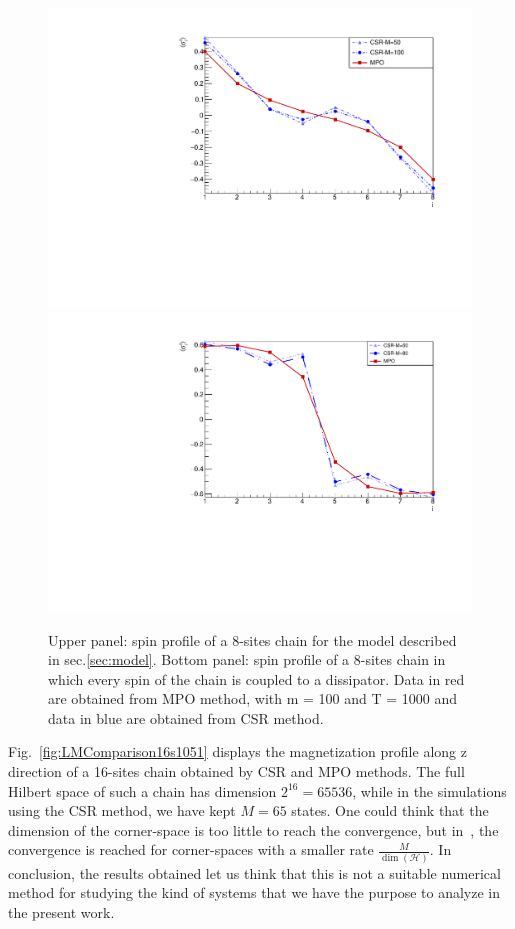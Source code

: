 \begin{figure}[H]
    \centering
    \includegraphics[scale=0.45]{Figures/8sites/1U1D_comparisonCSR_MPO_8site.pdf}
    \includegraphics[scale=0.45]{Figures/8sites/8sites_MPOvsCORNER_4U4D.pdf}
    \captionsetup{width=1.\linewidth}
    \caption{Upper panel: spin profile of a 8-sites chain for the model described in sec.\ref{sec:model}. Bottom panel: spin profile of a 8-sites chain in which every spin of the chain is coupled to a dissipator. Data in red are obtained from MPO method, with m = 100 and T = 1000 and data in blue are obtained from CSR method.}
    \label{fig:comparisonCSR_MPO_8site}
\end{figure}

Fig.~\ref{fig:LMComparison16s1051} displays the magnetization profile along z direction of a 16-sites chain obtained by CSR and MPO methods. The full Hilbert space of such a chain has dimension $2^{16} = 65536$, while in the simulations using the CSR method, we have kept $M = 65$ states. One could think that the dimension of the corner-space is too little to reach the convergence, but in~\cite{PhysRevLett.115.080604}, the convergence is reached for corner-spaces with a smaller rate $\frac{M}{\dim(\mathcal{H})}$. In conclusion, the results obtained let us think that this is not a suitable numerical method for studying the kind of systems that we have the purpose to analyze in the present work.

